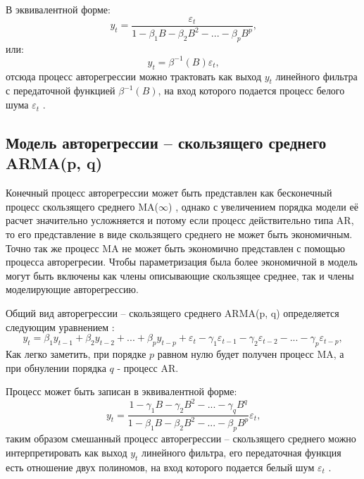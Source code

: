 \documentclass[a4paper,14pt,russian]{extreport}
\begin{document}
В эквивалентной форме:
\begin{equation}
	y_t = \frac{\varepsilon_t}{1 - \beta_1 B - \beta_2 B^2 - ... - \beta_p B^p} \text{,} 
\end{equation}
или:
\begin{equation}
	y_t = \beta^{-1}(B)\varepsilon_t \text{,}
\end{equation}
отсюда процесс авторегрессии можно трактовать как выход $y_t$ линейного 
фильтра с передаточной функцией $\beta^{-1}(B)$, на вход которого подается 
процесс белого шума $\varepsilon_t$ \cite{box2008}. 


\subsection{Модель авторегрессии -- скользящего среднего ARMA(p, q)}
Конечный процесс авторегрессии может быть представлен как бесконечный 
процесс скользящего среднего MA($\infty$) \cite{hamilton1994, chatfield2000}, 
однако с увеличением порядка модели её расчет значительно усложняется и 
потому если процесс действительно типа AR, то его представление в виде 
скользящего среднего не может быть экономичным. Точно так же процесс MA не 
может быть экономично представлен с помощью процесса авторегресии. Чтобы 
параметризация была более экономичной в модель могут быть включены как 
члены описывающие скользящее среднее, так и члены моделирующие 
авторегрессию.

Общий вид авторегрессии -- скользящего среднего ARMA(p, q) определяется 
следующим уравнением \cite{runova2013}:
\begin{equation}
	y_t = \beta_1 y_{t-1} + \beta_2 y_{t-2} + ... + \beta_p y_{t-p} + \varepsilon_t 
		- \gamma_1 \varepsilon_{t-1} - \gamma_2 \varepsilon_{t-2}  - ... 
		- \gamma_p \varepsilon_{t-p}, 
\end{equation}
Как легко заметить, при порядке $p$ равном нулю будет получен процесс MA, 
а при обнулении порядка $q$ - процесс AR. 

Процесс  может быть записан в эквивалентной форме:
\begin{equation}
	y_t = \frac
		{1 - \gamma_1 B - \gamma_2 B^2 - ... - \gamma_q B^q}
		{1 - \beta_1 B - \beta_2 B^2 - ... - \beta_p B^p}  \varepsilon_t \text{,} 
\end{equation}
таким образом смешанный процесс авторегрессии -- скользящего среднего 
можно интерпретировать как выход $y_t$ линейного фильтра, его передаточная 
функция есть отношение двух полиномов, на вход которого подается белый шум 
$\varepsilon_t$ \cite{box2008}. 
 
\end{document}
